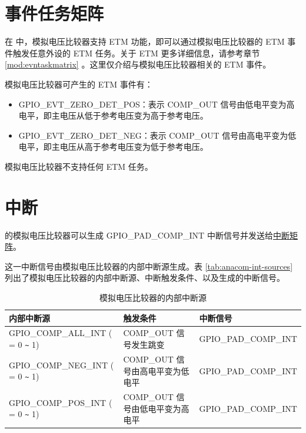 \documentclass[main\_\_CN.tex]{subfiles}
\begin{document}

\section{事件任务矩阵}
\label{sec:anacom-etm-func}

在 \chipname{} 中，模拟电压比较器支持 ETM 功能，即可以通过模拟电压比较器的 ETM 事件触发任意外设的 ETM 任务。关于 ETM 更多详细信息，请参考章节 \ref{mod:evntaskmatrix} 。这里仅介绍与模拟电压比较器相关的 ETM 事件。

模拟电压比较器可产生的 ETM 事件有：

\begin{itemize}
    \item GPIO\_EVT\_ZERO\_DET\_POS：表示 COMP\_OUT 信号由低电平变为高电平，即主电压从低于参考电压变为高于参考电压。
    \item GPIO\_EVT\_ZERO\_DET\_NEG：表示 COMP\_OUT 信号由高电平变为低电平，即主电压从高于参考电压变为低于参考电压。
\end{itemize}

模拟电压比较器不支持任何 ETM 任务。



\section{中断}

\chipname{} 的模拟电压比较器可以生成 GPIO\_PAD\_COMP\_INT 中断信号并发送给\hyperref[mod:intmtrx]{中断矩阵}。

这一中断信号由模拟电压比较器的内部中断源生成。表 \ref{tab:anacom-int-sources} 列出了模拟电压比较器的内部中断源、中断触发条件、以及生成的中断信号。

\begin{longtable}{ | L{5.5cm} | L{6cm} | L{4cm} | }
\caption{模拟电压比较器的内部中断源} \label{tab:anacom-int-sources}
\\ \hline
{}
\textbf{内部中断源} & \textbf{触发条件}  &  \textbf{中断信号}\\ \hline
\label{int:GPIOCOMPnALLINT}GPIO\_COMP\_ALL\_INT ( = 0 \verb+~+ 1) & COMP\_OUT 信号发生跳变  &  GPIO\_PAD\_COMP\_INT  \\ \hline
\label{int:GPIOCOMPnNEGINT}GPIO\_COMP\_NEG\_INT ( = 0 \verb+~+ 1) & COMP\_OUT 信号由高电平变为低电平   & GPIO\_PAD\_COMP\_INT \\ \hline
\label{int:GPIOCOMPnPOSINT}GPIO\_COMP\_POS\_INT ( = 0 \verb+~+ 1)& COMP\_OUT 信号由低电平变为高电平  & GPIO\_PAD\_COMP\_INT \\ \hline
\end{longtable}
\end{document}
